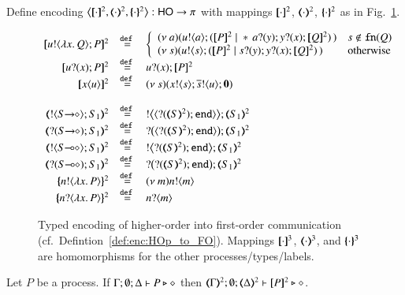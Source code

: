 \begin{definition}\rm
\label{def:enc:HOp_to_FO}
	Define encoding
	$\enco{\map{\cdot}^2, \mapt{\cdot}^2, \mapa{\cdot}^2}: \HO \to \sessp$
	with mappings 
	$[\!\![\cdot]\!\!]^{2}$, $(\!\!\langle\cdot\rangle\!\!)^{2}$, $\{\!\!\{\cdot\}\!\!\}^{2}$ as
	in Fig.~\ref{fig:enc:HOp_to_FO}.
\end{definition}
%
\begin{figure}[t]
	\[
	\begin{array}{rcl}
		\pmap{\bout{u}{\abs{x}{Q}} P}{2} & \defeq &  \left\{
		\begin{array}{ll}
			\newsp{a}{\bout{u}{a} (\pmap{P}{2} \Par \repl{} \binp{a}{y} \binp{y}{x} \pmap{Q}{2})\,} & s \notin \fn{Q} \\
			\newsp{s}{\bout{u}{s} (\pmap{P}{2} \Par \binp{s}{y} \binp{y}{x} \pmap{Q}{2})\,} & \textrm{otherwise} %
		\end{array}
		\right.
		\\
		\pmap{\binp{u}{x} P}{2} &\defeq&  \binp{u}{x} \pmap{P}{2}\\
		\pmap{\appl{x}{u}}{2} & \defeq & \newsp{s}{\bout{x}{s} \bout{\dual{s}}{u} \inact}
		\\
		\\
		\tmap{\btout{\shot{S}}S_1}{2} & \defeq & \bbtout{\chtype{\btinp{\tmap{S}{2}}\tinact}}\tmap{S_1}{2} \\
		\tmap{\btinp{\shot{S}}S_1}{2} & \defeq & \bbtinp{\chtype{\btinp{\tmap{S}{2}}\tinact}}\tmap{S_1}{2} \\

		\tmap{\btout{\lhot{S}}S_1}{2} & \defeq & \bbtout{\btinp{\tmap{S}{2}}\tinact}\tmap{S_1}{2} \\
		\tmap{\btinp{\lhot{S}}S_1}{2} & \defeq & \bbtinp{\btinp{\tmap{S}{2}}\tinact}\tmap{S_1}{2} \\
		\mapa{\bactout{n}{\abs{ x}{P}} }^{2} &  \defeq & \news{m} \bactout{n}{m} \\
		\mapa{\bactinp{n}{\abs{ x}{P}} }^{2} &  \defeq & \bactinp{n}{m}
	\end{array}
	\]
	\caption{
		Typed encoding of higher-order  into first-order communication (cf.~Defintion~\ref{def:enc:HOp_to_FO}).
		\label{fig:enc:HOp_to_FO}
		Mappings 
		$[\!\![\cdot]\!\!]^3$,
		$(\!\!\langle\cdot\rangle\!\!)^3$, 
		and 
		$\{\!\!\{\cdot\}\!\!\}^3$
		are homomorphisms for the other processes/types/labels. 
	}
\end{figure}


\begin{proposition}\rm
\label{prop:typepres_HOp_to_FO}
	Let $P$ be a \HOp process. 
	If $\Gamma; \emptyset; \Delta \vdash P \triangleright \diamond$ then 
	$\mapt{\Gamma}^{2}; \emptyset; \mapt{\Delta}^{2} \proves \map{P}^{2} \hastype \Proc$.
\end{proposition}

